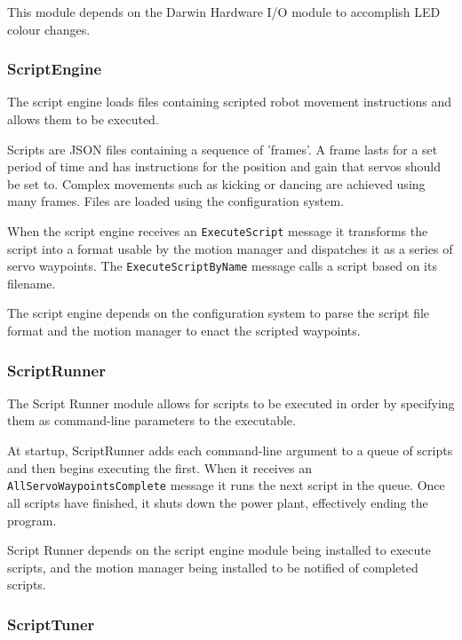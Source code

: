 \documentclass[english,12pt]{scrartcl}
\begin{document}
				This module depends on the Darwin Hardware I/O module to accomplish LED colour
				changes.
				
				
			\subsubsection{ScriptEngine}
				The script engine loads files containing scripted robot movement instructions and
				allows them to be executed.
				
				Scripts are JSON files containing a sequence of 'frames'. A frame lasts for a
				set period of time and has instructions for the position and gain that servos
				should be set to. Complex movements such as kicking or dancing are achieved
				using many frames. Files are loaded using the configuration system.
				
				When the script engine receives an \texttt{ExecuteScript} message it transforms
				the script into a format usable by the motion manager and dispatches it as a
				series of servo waypoints. The \texttt{ExecuteScriptByName} message calls a script
				based on its filename.
				
				The script engine depends on the configuration system to parse the script file
				format and the motion manager to enact the scripted waypoints.
			
				
			\subsubsection{ScriptRunner}
				The Script Runner module allows for scripts to be executed in order by specifying
				them as command-line parameters to the executable.
				
				At startup, ScriptRunner adds each command-line argument to a queue of scripts
				and then begins executing the first. When it receives an
				\texttt{AllServoWaypointsComplete} message it runs the next script in the queue.
				Once all scripts have finished, it shuts down the power plant, effectively ending
				the program.
				
				Script Runner depends on the script engine module being installed to execute
				scripts, and the motion manager being installed to be notified of completed
				scripts.
			
			\subsubsection{ScriptTuner}


	
	
	
	\printglossaries
\end{document}
